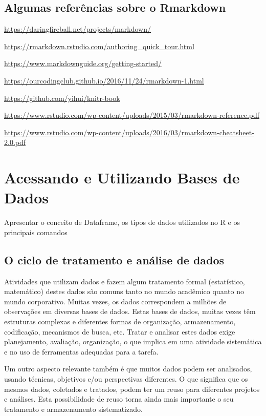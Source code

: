\documentclass[12pt,a4paper,oneside]{erdc}
\begin{document}
	
	\section{Algumas referências sobre o Rmarkdown}
	
	\url{https://daringfireball.net/projects/markdown/}
	
	\url{https://rmarkdown.rstudio.com/authoring_quick_tour.html}
	
	\url{https://www.markdownguide.org/getting-started/}
	
	\url{https://ourcodingclub.github.io/2016/11/24/rmarkdown-1.html}
	
	\url{https://github.com/yihui/knitr-book}
	
	\url{https://www.rstudio.com/wp-content/uploads/2015/03/rmarkdown-reference.pdf}
	
	\url{https://www.rstudio.com/wp-content/uploads/2016/03/rmarkdown-cheatsheet-2.0.pdf}
	





%
%
%


		
\chapter{Acessando e Utilizando Bases de Dados}

Apresentar o conceito de Dataframe, os tipos de dados utilizados no R e os principais comandos  

\section{O ciclo de tratamento e análise de dados}

Atividades que utilizam dados e fazem algum tratamento formal (estatístico, matemático) destes dados são comuns tanto no mundo acadêmico quanto no mundo corporativo. Muitas vezes, os dados correspondem a milhões de observações em diversas bases de dados. Estas bases de dados, muitas vezes têm estruturas complexas e diferentes formas de organização, armazenamento, codificação, mecanismos de busca, etc. Tratar e analisar estes dados exige planejamento, avaliação, organização, o que implica em uma atividade sistemática e no uso de ferramentas adequadas para a tarefa.

Um outro aspecto relevante também é que muitos dados podem ser analisados, usando técnicas, objetivos e/ou perspectivas diferentes. O que significa que os mesmos dados, coletados e tratados, podem ter um reuso para diferentes projetos e análises. Esta possibilidade de reuso torna ainda mais importante o seu tratamento e armazenamento sistematizado. 
\end{document}
